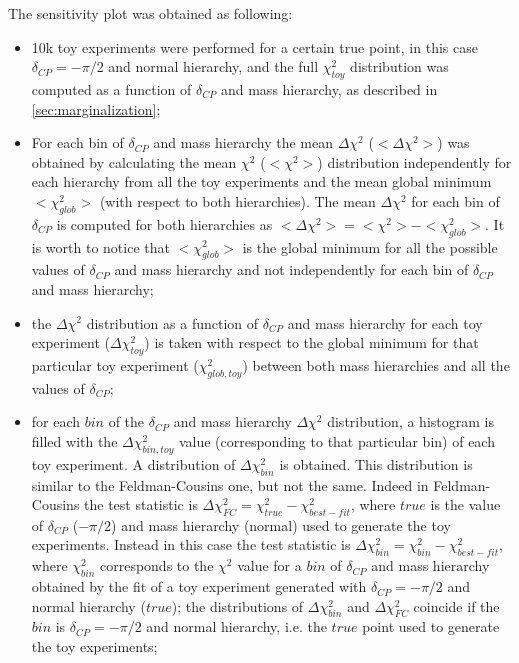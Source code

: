 The sensitivity plot was obtained as following:
\begin{itemize}

\item 10k toy experiments were performed for a certain true point,
	in this case $\delta_{CP} = -\pi/2$ and normal hierarchy,
	and the full $\chi^2_{toy}$ distribution was computed as a function of
	$\delta_{CP}$ and mass hierarchy, as described in \cref{sec:marginalization};
	

\item	For each bin of $\delta_{CP}$ and mass hierarchy the mean $\Delta \chi^2$  ($<\Delta \chi^2 >$)
	was obtained by calculating the mean $\chi^2$ ($<\chi^2>$) distribution independently for each hierarchy 
	from all the toy experiments and
	the mean global minimum $<\chi^2_{glob}>$ (with respect to both hierarchies).
	The mean $\Delta \chi^2$ for each bin of $\delta_{CP}$ is computed for both hierarchies as
	$<\Delta \chi^2 > = <\chi^2> - <\chi^2_{glob}> $.
	It is worth to notice that $<\chi^2_{glob}>$ is the global minimum for all the 
	possible values of $\delta_{CP}$ and mass hierarchy and 
	not independently for each bin of $\delta_{CP}$ and mass hierarchy;
	
\item the $\Delta \chi^2$ distribution as a function of $\delta_{CP}$ and mass hierarchy
	for each toy experiment ($\Delta \chi^2_{toy}$) is taken with respect to the global minimum
	for that particular toy experiment ($\chi^2_{glob, toy}$)
	between both mass hierarchies and all the values of $\delta_{CP}$;

\item for each $bin$ of the $\delta_{CP}$ and mass hierarchy $\Delta \chi^2$ distribution,
	a histogram is filled with 
	the $\Delta \chi^2_{bin, toy}$ value (corresponding to that particular bin) of each toy experiment.	
	A distribution of $\Delta \chi^2_{bin}$ is obtained.
	This distribution is similar to the Feldman-Cousins one, but not the same. 
	Indeed in Feldman-Cousins the test statistic is $\Delta \chi^2_{FC} = \chi^2_{true} - \chi^2_{best-fit}$,
	where $true$ is the value of $\delta_{CP}$ ($-\pi/2$) and mass hierarchy (normal) 
	used to generate the toy experiments.
	Instead in this case the test statistic is $\Delta \chi^2_{bin} = \chi^2_{bin} - \chi^2_{best-fit}$, 
	where $\chi^2_{bin}$ corresponds to the $\chi^2$ value for a $bin$ of $\delta_{CP}$ and mass hierarchy 
	obtained by the fit of a toy experiment generated with $\delta_{CP} = -\pi/2$ and normal hierarchy ($true$);
	the distributions of $\Delta \chi^2_{bin}$ and $\Delta \chi^2_{FC}$ coincide if the $bin$ is 
	$\delta_{CP} = -\pi/2$ and normal hierarchy, i.e. the $true$ point used to generate the toy experiments;
	

\end{itemize}
